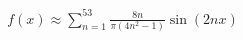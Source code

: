 \documentclass[preview]{standalone}
\begin{document}
\begin{align*}
f(x) \approx \sum_{n=1}^{53} \frac{8n}{\pi(4n^2-1)} \sin(2nx)
\end{align*}
\end{document}
